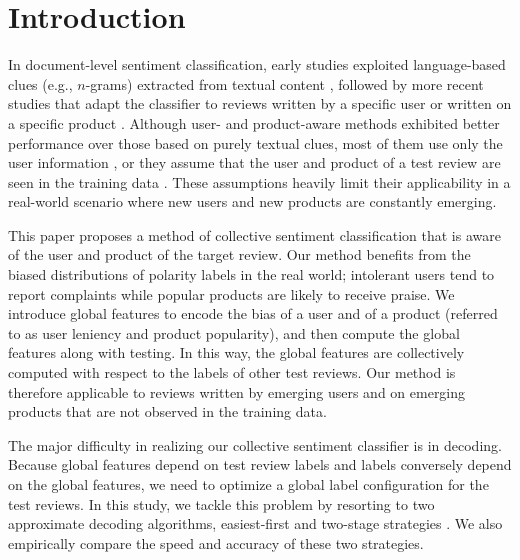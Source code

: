 \documentclass[english]{jnlp_1.4}
\begin{document}
\maketitle


\section{Introduction}

In document-level sentiment classification, early studies
exploited language-based clues (e.g., $n$-grams) extracted from
textual content \cite{Turney:2002,Pang:2002}, followed by more recent studies that adapt the classifier to reviews written by a specific user or written on a specific product \cite{TanLTJZL11,Seroussi:2010,speriosu2011,LiFangtao:2011}. 
Although user- and product-aware methods exhibited better performance over those based on purely textual clues, most of them use only the user information \cite{TanLTJZL11,Seroussi:2010,speriosu2011}, or they assume that the user and product of a test review are seen in the training data \cite{LiFangtao:2011}. 
These assumptions heavily limit their applicability in a real-world scenario where new users and new products are constantly emerging.

This paper proposes a method of collective sentiment classification that is aware of the user and product of the target review.
Our method benefits from the biased distributions of polarity labels in the real world;  intolerant users tend to report complaints while popular products are likely to receive praise. 
We introduce global features to encode the bias of a user and of a product (referred to as user leniency and product popularity), and then compute the global features along with testing. 
In this way, the global features are collectively computed with respect to the labels of other test reviews. 
Our method is therefore applicable to reviews written by emerging users and on emerging products that are not observed in the training data.

The major difficulty in realizing our collective sentiment classifier is in decoding. Because global features depend on test review labels and labels conversely depend on the global features, we need to optimize a global label configuration for the test reviews. 
In this study, we tackle this problem by resorting to two approximate decoding algorithms, easiest-first \cite{Tsuruoka05} and two-stage strategies \cite{Krishnan06}.
We also empirically compare the speed and accuracy of these two strategies.
\end{document}
